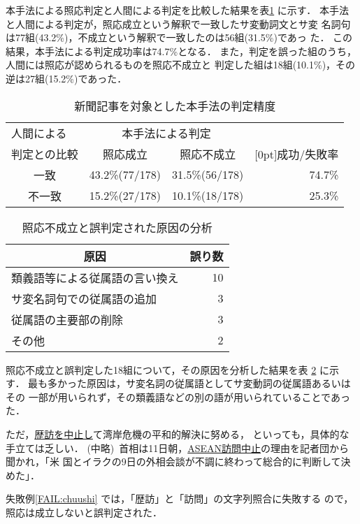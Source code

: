本手法による照応判定と人間による判定を比較した結果を表\ref{tab:result}
に示す．
本手法と人間による判定が，照応成立という解釈で一致したサ変動詞文とサ変
名詞句は77組(43.2\%)，不成立という解釈で一致したのは56組(31.5\%)であっ
た． 
この結果，本手法による判定成功率は74.7\%となる．
また，判定を誤った組のうち，人間には照応が認められるものを照応不成立と
判定した組は18組(10.1\%)，その逆は27組(15.2\%)であった．
\begin{table}[htbp]
\caption{新聞記事を対象とした本手法の判定精度}
\label{tab:result}
\begin{center}
\begin{tabular}{|c|c|c|r|}\hline
\multicolumn{1}{|l}{人間による}&\multicolumn{2}{|c|}{本手法による判定}
&\\\cline{2-3}
\multicolumn{1}{|l|}{判定との比較}&照応成立&照応不成立
&\multicolumn{1}{|c|}{\raisebox{1.5ex}[0pt]{成功/失敗率}}\\\hline\hline
一致   &43.2\%(77/178)&31.5\%(56/178)&74.7\%\\\hline
不一致 &15.2\%(27/178)&10.1\%(18/178)&25.3\%\\\hline
\end{tabular}
\end{center}
\end{table}

\begin{table}[htbp]
\caption{照応不成立と誤判定された原因の分析}
\label{tab:fail}
\begin{center}
\begin{tabular}{|l|r|}\hline
\multicolumn{1}{|c}{原因}&\multicolumn{1}{|c|}{誤り数}\\\hline\hline
類義語等による従属語の言い換え&10\\\hline
サ変名詞句での従属語の追加&3\\\hline
従属語の主要部の削除&3\\\hline
その他&2\\\hline
\end{tabular}
\end{center}
\end{table}
照応不成立と誤判定した18組について，その原因を分析した結果を表
\ref{tab:fail} に示す．
最も多かった原因は，サ変名詞の従属語としてサ変動詞の従属語あるいはその
一部が用いられず，その類義語などの別の語が用いられていることであった．
\begin{FAIL}
\fail  ただ，\underline{歴訪を中止し}て湾岸危機の平和的解決に努める，
といっても，具体的な手立ては乏しい．
(中略)\ 
首相は11日朝，\underline{ASEAN訪問中止}の理由を記者団から聞かれ，「米
国とイラクの9日の外相会談が不調に終わって総合的に判断して決めた」．
\label{FAIL:chuushi}
\end{FAIL}
失敗例\ref{FAIL:chuushi} では，「歴訪」と「訪問」の文字列照合に失敗する
ので，照応は成立しないと誤判定された．

